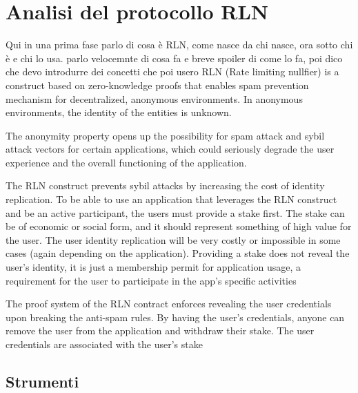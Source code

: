 \chapter{Analisi del protocollo RLN}
\label{chap:rln-protocol}

Qui in una prima fase parlo di cosa è RLN, come nasce da chi nasce, ora sotto chi è e chi lo usa. parlo velocemnte di
cosa fa e breve spoiler di come lo fa, poi dico che devo introdurre dei concetti che poi usero RLN (Rate limiting
nullfier) is a construct based on zero-knowledge proofs that enables spam prevention mechanism for decentralized,
anonymous environments. In anonymous environments, the identity of the entities is unknown.

The anonymity property opens up the possibility for spam attack and sybil attack vectors for certain applications, which
could seriously degrade the user experience and the overall functioning of the application.

The RLN construct prevents sybil attacks by increasing the cost of identity replication. To be able to use an
application that leverages the RLN construct and be an active participant, the users must provide a stake first. The
stake can be of economic or social form, and it should represent something of high value for the user. The user identity
replication will be very costly or impossible in some cases (again depending on the application). Providing a stake does
not reveal the user’s identity, it is just a membership permit for application usage, a requirement for the user to
participate in the app’s specific activities

The proof system of the RLN contract enforces revealing the user credentials upon breaking the anti-spam rules. By
having the user’s credentials, anyone can remove the user from the application and withdraw their stake. The user
credentials are associated with the user’s stake
\section{Strumenti}

